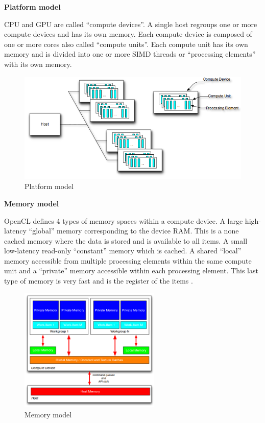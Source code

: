 \textbf{Platform model}

CPU and GPU are called “compute devices”. A single host regroups one or more
compute devices and has its own memory. Each compute device is composed of one
or more cores also called “compute units”. Each compute unit has its own memory
and is divided into one or more SIMD threads or “processing elements” with its
own memory. \citep{Reference4}

\begin{figure}[H] \centering
\includegraphics[width=\textwidth]{./Figures/plateform_model.png}
\caption[Platform model]{Platform model \citep{Reference4}}
\label{fig:plateform_model} \end{figure}


\textbf{Memory model}

OpenCL defines 4 types of memory spaces within a compute device. A large
high-latency “global” memory corresponding to the device RAM. This is a none
cached memory  where the data is stored and is available to all items. A small
low-latency read-only “constant” memory which is cached. A shared “local”
memory accessible from multiple processing elements within the same compute
unit and a “private” memory accessible within each processing element. This
last type of memory is very fast and is the register of the items
\citep{Reference4}.

\begin{figure}[H] \centering
  \includegraphics[width=0.6\textwidth]{./Figures/memory_model.png}
  \caption[Memory model]{Memory model \citep{Reference4}}
  \label{fig:memory_model} 
\end{figure}

